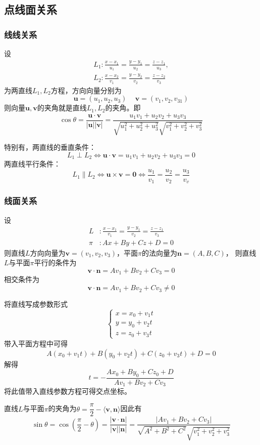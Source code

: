 \subsection{点线面关系}
\subsubsection{线线关系}
设
\begin{align*}
    L_1 : \frac{x-x_1}{u_1} = \frac{y-y_1}{u_2} = \frac{z-z_1}{u_3}, \\
    L_2 : \frac{x-x_2}{v_1} = \frac{y-y_2}{v_2} = \frac{z-z_2}{v_3}
\end{align*}
为两直线$L_1,L_2$方程，方向向量分别为
\[ \bm{u}=(u_1,u_2,u_3)\,\quad\bm{v}=(v_1,v_2,v_31) \]
则向量$\bm{u},\bm{v}$的夹角就是直线$L_1,L_2$的夹角。即
\[
    \cos\theta
    = \frac{\bm{u}\cdot\bm{v}}{|\bm{u}||\bm{v}|}
    = \frac{u_1v_1 + u_2v_2 + u_3v_3}{\sqrt{u_1^2+u_2^2+u_3^2}\sqrt{v_1^2+v_2^2+v_3^2}}
\]

特别有，两直线的垂直条件：
\[ L_1 \perp L_2 \iff \bm{u}\cdot\bm{v} = u_1v_1 + u_2v_2 + u_3v_3 = 0 \]
两直线平行条件：
\[ L_1 \parallel L_2 \iff \bm{u}\times\bm{v} = \bm{0} \iff \frac{u_1}{v_1} = \frac{u_2}{v_2} = \frac{u_3}{v_v}  \]

\subsubsection{线面关系}
设
\begin{align*}
    L   & : \frac{x-x_1}{v_1} = \frac{y-y_1}{v_2} = \frac{z-z_1}{v_3} \\
    \pi & : Ax+By+Cz+D=0
\end{align*}
则直线$L$方向向量为$\bm{v}=(v_1,v_2,v_3)$，平面$\pi$的法向量为$\bm{n}=(A,B,C)$，
则直线$L$与平面$\pi$平行的条件为
\[ \bm{v}\cdot\bm{n} = Av_1 + Bv_2 + Cv_3 = 0 \]
相交条件为
\[ \bm{v}\cdot\bm{n} = Av_1 + Bv_2 + Cv_3 \neq 0 \]

将直线写成参数形式
\[
    \begin{cases}
        x = x_0 + v_1t \\
        y = y_0 + v_2t \\
        z = z_0 + v_3t
    \end{cases}
\]
带入平面方程中可得
\[ A(x_0 + v_1t)+B(y_0 + v_2t)+C(z_0 + v_3t)+D=0 \]
解得
\[ t = -\frac{Ax_0+By_0+Cz_0+D}{Av_1 + Bv_2 + Cv_3} \]
将此值带入直线参数方程可得交点坐标。

直线$L$与平面$\pi$的夹角为$\theta = \dfrac{\pi}{2} - \langle\bm{v},\bm{n}\rangle$因此有
\[
    \sin\theta = \cos\left(\frac{\pi}{2}-\theta\right)
    = \frac{|\bm{v}\cdot\bm{n}|}{|\bm{v}||\bm{n}|}
    = \frac{|Av_1 + Bv_2 + Cv_3|}{\sqrt{A^2+B^2+C^2}\sqrt{v_1^2+v_2^2+v_3^2}}
\]

